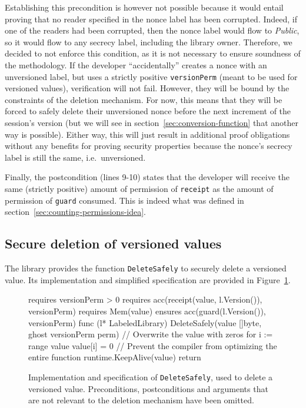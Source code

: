 Establishing this precondition is however not possible because it would entail proving that no reader specified in the nonce label has been corrupted. Indeed, if one of the readers had been corrupted, then the nonce label would flow to \emph{Public}, so it would flow to any secrecy label, including the library owner.
Therefore, we decided to not enforce this condition, as it is not necessary to ensure soundness of the methodology.
If the developer “accidentally” creates a nonce with an unversioned label, but uses a strictly positive \texttt{versionPerm} (meant to be used for versioned values), verification will not fail.
However, they will be bound by the constraints of the deletion mechanism. For now, this means that they will be forced to safely delete their unversioned nonce before the next increment of the session's version (but we will see in section~\ref{sec:conversion-function} that another way is possible).
Either way, this will just result in additional proof obligations without any benefits for proving security properties because the nonce's secrecy label is still the same, i.e.\ unversioned.

Finally, the postcondition (lines 9-10) states that the developer will receive the same (strictly positive) amount of permission of \texttt{receipt} as the amount of permission of \texttt{guard} consumed. This is indeed what was defined in section~\ref{sec:counting-permissions-idea}.

\subsection{Secure deletion of versioned values}
\label{sec:secure-deletion-of-versioned-values}

The library provides the function \texttt{DeleteSafely} to securely delete a versioned value. Its implementation and simplified specification are provided in Figure~\ref{lst:delete-safely}.

\begin{figure}
    \begin{gobra}
requires versionPerm > 0
requires acc(receipt(value, l.Version()), versionPerm)
requires Mem(value)
ensures  acc(guard(l.Version()), versionPerm)
func (l* LabeledLibrary) DeleteSafely(value []byte,
    ghost versionPerm perm) {
    // Overwrite the value with zeros
    for i := range value {
        value[i] = 0
    }
    // Prevent the compiler from optimizing the entire function
    runtime.KeepAlive(value)
    return
}
    \end{gobra}
    \caption{Implementation and specification of \texttt{DeleteSafely}, used to delete a versioned value. Preconditions, postconditions and arguments that are not relevant to the deletion mechanism have been omitted.}
    \label{lst:delete-safely}
\end{figure}

